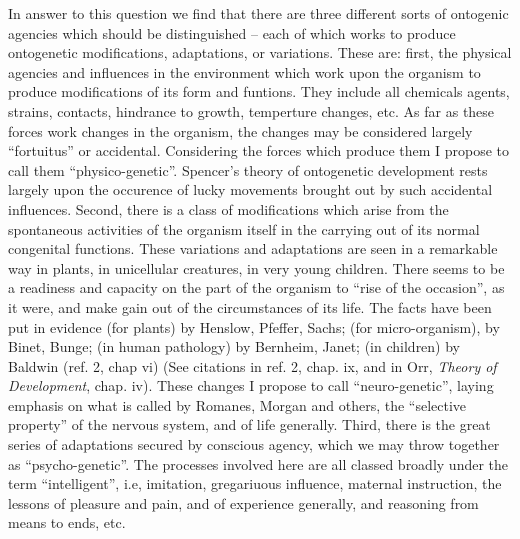 \documentclass[11pt,twoside,a4paper]{article}
\begin{document}
In answer to this question we find that there are three different sorts of ontogenic agencies which should be distinguished -- each of which works to produce ontogenetic modifications, adaptations, or variations. These are: first, the physical agencies and influences in the environment which work upon the organism to produce modifications of its form and funtions. They include all chemicals agents, strains, contacts, hindrance to growth, temperture changes, etc. As far as these forces work changes in the organism, the changes may be considered largely ``fortuitus'' or accidental. Considering the forces which produce them I propose to call them ``physico-genetic''. Spencer's theory of ontogenetic development rests largely upon the occurence of lucky movements brought out by such accidental influences. Second, there is a class of modifications which arise from the spontaneous activities of the organism itself in the carrying out of its normal congenital functions. These variations and adaptations are seen in a remarkable way in plants, in unicellular creatures, in very young children. There seems to be a readiness and capacity on the part of the organism to ``rise of the occasion'', as it were, and make gain out of the circumstances of its life. The facts have been put in evidence (for plants) by Henslow, Pfeffer, Sachs; (for micro-organism), by Binet, Bunge; (in human pathology) by Bernheim, Janet; (in children) by Baldwin (ref. 2, chap vi) (See citations in ref. 2, chap. ix, and in Orr, \emph{Theory of Development}, chap. iv). These changes I propose to call ``neuro-genetic'', laying emphasis on what is called by Romanes, Morgan and others, the ``selective property'' of the nervous system, and of life generally. Third, there is the great series of adaptations secured by conscious agency, which we may throw together as ``psycho-genetic''. The processes involved here are all classed broadly under the term ``intelligent'', i.e, imitation, gregariuous influence, maternal instruction, the lessons of pleasure and pain, and of experience generally, and reasoning from means to ends, etc.~\\

\clearpage
\end{document}
